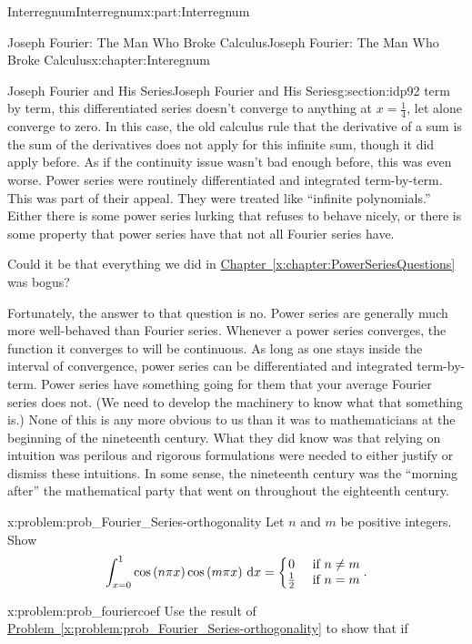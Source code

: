 \documentclass[oneside,10pt,]{book}
\newcommand{\xreffont}{\relax}
\numberwithin{equation}{section}
\newcommand{\dx}[1]{\,{\rm d}#1}
\newcommand{\amp}{&}
\begin{document}
\begin{partptx}{Interregnum}{}{Interregnum}{}{}{x:part:Interregnum}
\begin{chapterptx}{Joseph Fourier: The Man Who Broke Calculus}{}{Joseph Fourier: The Man Who Broke Calculus}{}{}{x:chapter:Interegnum}
\begin{sectionptx}{Joseph Fourier and His Series}{}{Joseph Fourier and His Series}{}{}{g:section:idp92}
term by term, this differentiated series doesn't converge to anything at \(x=\frac{1}{4}\), let alone converge to zero. In this case, the old calculus rule that the derivative of a sum is the sum of the derivatives does not apply for this infinite sum, though it did apply before. As if the continuity issue wasn't bad enough before, this was even worse. Power series were routinely differentiated and integrated term-by-term. This was part of their appeal. They were treated like ``infinite polynomials.'' Either there is some power series lurking that refuses to behave nicely, or there is some property that power series have that not all Fourier series have.%
\par
Could it be that everything we did in \hyperref[x:chapter:PowerSeriesQuestions]{Chapter~{\xreffont\ref{x:chapter:PowerSeriesQuestions}}} was bogus?%
\par
Fortunately, the answer to that question is no. Power series are generally much more well-behaved than Fourier series. Whenever a power series converges, the function it converges to will be continuous. As long as one stays inside the interval of convergence, power series can be differentiated and integrated term-by-term. Power series have something going for them that your average Fourier series does not. (We need to develop the machinery to know what that something is.) None of this is any more obvious to us than it was to mathematicians at the beginning of the nineteenth century. What they did know was that relying on intuition was perilous and rigorous formulations were needed to either justify or dismiss these intuitions. In some sense, the nineteenth century was the ``morning after'' the mathematical party that went on throughout the eighteenth century.%
\begin{problem}{}{x:problem:prob_Fourier_Series-orthogonality}%
 Let \(n\) and \(m\) be positive integers. Show%
\begin{equation*}
\int_{x=0}^1\cos\left(n\pi x\right)\cos\left(m\pi x\right)\dx{ x}=\left\{ \begin{matrix}0\amp \text{ if } n\neq m\\ \frac{1}{2}\amp \text{ if } n=m \end{matrix} \right.\text{.}
\end{equation*}
%
\end{problem}
\begin{problem}{}{x:problem:prob_fouriercoef}%
 Use the result of \hyperref[x:problem:prob_Fourier_Series-orthogonality]{Problem~{\xreffont\ref{x:problem:prob_Fourier_Series-orthogonality}}} to show that if%

\end{problem}
\end{sectionptx}
\end{chapterptx}
\end{partptx}
\end{document}
